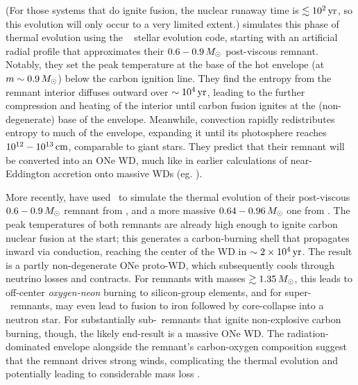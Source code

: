 {\noindent (For those systems that do ignite fusion, the nuclear runaway time is $\lesssim10^2\,\mathrm{yr}$, so this evolution will only occur to a very limited extent.)  \cite{shen+12} simulates this phase of thermal evolution using the \mesa\ \citep{paxt+11, paxt+13, paxt+15} stellar evolution code, starting with an artificial radial profile that approximates their $0.6-0.9\,\Msun$ post-viscous remnant.  Notably, they set the peak temperature at the base of the hot envelope (at $m \sim 0.9\,\Msun$) below the carbon ignition line.  They find the entropy from the remnant interior diffuses outward over $\sim10^4\,\mathrm{yr}$, leading to the further compression and heating of the interior until carbon fusion ignites at the (non-degenerate) base of the envelope.  Meanwhile, convection rapidly redistributes entropy to much of the envelope, expanding it until its photosphere reaches $10^{12}-10^{13}\,\mathrm{cm}$, comparable to giant stars.  They predict that their remnant will be converted into an ONe WD, much like in earlier calculations of near-Eddington accretion onto massive WDs (eg. \citealt{saion85}).

More recently, \cite{schw+16} have used \mesa\ to simulate the thermal evolution of their post-viscous $0.6-0.9\,\Msun$ remnant from \cite{schw+12}, and a more massive $0.64-0.96\,\Msun$ one from \cite{rask+14}.  The peak temperatures of both remnants are already high enough to ignite carbon nuclear fusion at the start; this generates a carbon-burning shell that propagates inward via conduction, reaching the center of the WD in $\sim2\times10^4\,\mathrm{yr}$.  The result is a partly non-degenerate ONe proto-WD, which subsequently cools through neutrino losses and contracts.  For remnants with masses $\gtrsim1.35\,\Msun$, this leads to off-center \textit{oxygen-neon} burning to silicon-group elements, and for super-\Mch\ remnants, may even lead to fusion to iron followed by core-collapse into a neutron star.  For substantially sub-\Mch\ remnants that ignite non-explosive carbon burning, though, the likely end-result is a massive ONe WD.  The radiation-dominated envelope alongside the remnant's carbon-oxygen composition suggest that the remnant drives strong winds, complicating the thermal evolution and potentially leading to considerable mass loss \citep{shen+12, schw+16}.

}
